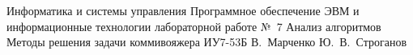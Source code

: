 \makereporttitle
    {Информатика и системы управления}
    {Программное обеспечение ЭВМ и информационные технологии}
    {лабораторной работе №~7}
    {Анализ алгоритмов}
    {Методы решения задачи коммивояжера}
    {}
    {ИУ7-53Б}
    {В.~Марченко}
    {Ю.~В.~Строганов}
    {}
